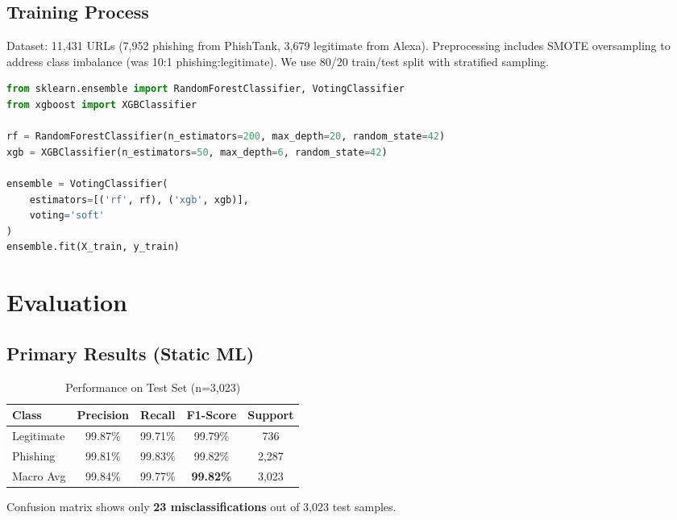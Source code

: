 \documentclass[10pt, conference]{IEEEtran}
\begin{document}
\subsection{Training Process}

Dataset: 11,431 URLs (7,952 phishing from PhishTank, 3,679 legitimate from Alexa). Preprocessing includes SMOTE oversampling to address class imbalance (was 10:1 phishing:legitimate). We use 80/20 train/test split with stratified sampling.

\begin{lstlisting}[language=Python, caption={Training code snippet}]
from sklearn.ensemble import RandomForestClassifier, VotingClassifier
from xgboost import XGBClassifier

rf = RandomForestClassifier(n_estimators=200, max_depth=20, random_state=42)
xgb = XGBClassifier(n_estimators=50, max_depth=6, random_state=42)

ensemble = VotingClassifier(
    estimators=[('rf', rf), ('xgb', xgb)],
    voting='soft'
)
ensemble.fit(X_train, y_train)
\end{lstlisting}

\section{Evaluation}
\label{sec:evaluation}

\subsection{Primary Results (Static ML)}

\begin{table}[t]
    \centering
    \caption{Performance on Test Set (n=3,023)}
    \label{tab:results}
    \begin{tabular}{@{}lcccc@{}}
        \toprule
        Class & Precision & Recall & F1-Score & Support \\
        \midrule
        Legitimate & 99.87\% & 99.71\% & 99.79\% & 736 \\
        Phishing & 99.81\% & 99.83\% & 99.82\% & 2,287 \\
        \midrule
        Macro Avg & 99.84\% & 99.77\% & \textbf{99.82\%} & 3,023 \\
        \bottomrule
    \end{tabular}
\end{table}

Confusion matrix shows only \textbf{23 misclassifications} out of 3,023 test samples.
\end{document}
